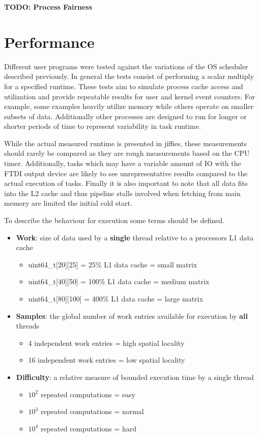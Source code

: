 \documentclass[11pt]{article}
\begin{document}
\textbf{TODO: Process Fairness}


\section{Performance}
\label{sec:performance}
Different user programs were tested against the variations of the OS scheduler described previously.  In general the tests consist of performing a scalar multiply for a specified runtime.  These tests aim to simulate process cache access and utilization and provide repeatable results for user and kernel event counters.  For example, some examples heavily utilize memory while others operate on smaller subsets of data.  Additionally other processes are designed to run for longer or shorter periods of time to represent variability in task runtime.

While the actual measured runtime is presented in jiffies, these measurements should rarely be compared as they are rough measurements based on the CPU timer.  Additionally, tasks which may have a variable amount of IO with the FTDI output device are likely to see unrepresentative results compared to the actual execution of tasks.  Finally it is also important to note that all data fits into the L2 cache and thus pipeline stalls involved when fetching from main memory are limited the initial cold start.

To describe the behaviour for execution some terms should be defined.
\begin{itemize}
	\item \textbf{Work}: size of data used by a \textbf{single} thread relative to a processors L1 data cache
	\begin{itemize}
		\item uint64\_t[20][25] 	= 25\% L1 data cache	= small matrix
		\item uint64\_t[40][50] 	= 100\% L1 data cache	= medium matrix
		\item uint64\_t[80][100] 	= 400\% L1 data cache	= large matrix
	\end{itemize}
	\item \textbf{Samples}: the global number of work entries available for execution by \textbf{all} threads
	\begin{itemize}
		\item 4 independent work entries 	= high spatial locality
		\item 16 independent work entries 	= low spatial locality
	\end{itemize}
	\item \textbf{Difficulty}: a relative measure of bounded execution time by a single thread
	\begin{itemize}
		\item $10^2$ repeated computations = easy
		\item $10^3$ repeated computations = normal
		\item $10^4$ repeated computations = hard
	\end{itemize}
\end{itemize}
\end{document}
